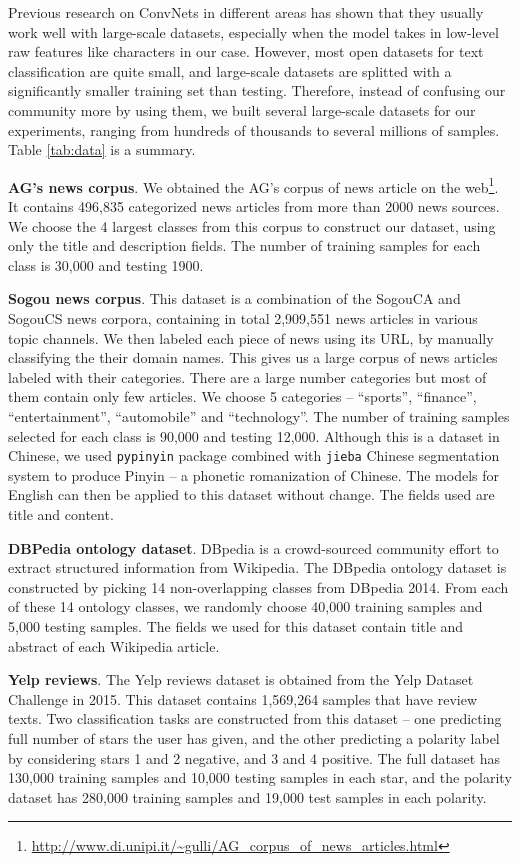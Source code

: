 Previous research on ConvNets in different areas has shown that they usually work well with large-scale datasets, especially when the model takes in low-level raw features like characters in our case. However, most open datasets for text classification are quite small, and large-scale datasets are splitted with a significantly smaller training set than testing\cite{LYRL04}. Therefore, instead of confusing our community more by using them, we built several large-scale datasets for our experiments, ranging from hundreds of thousands to several millions of samples. Table \ref{tab:data} is a summary.

\textbf{AG's news corpus}. We obtained the AG's corpus of news article on the web\footnote{\url{http://www.di.unipi.it/~gulli/AG_corpus_of_news_articles.html}}. It contains 496,835 categorized news articles from more than 2000 news sources. We choose the 4 largest classes from this corpus to construct our dataset, using only the title and description fields. The number of training samples for each class is 30,000 and testing 1900.

\textbf{Sogou news corpus}. This dataset is a combination of the SogouCA and SogouCS news corpora\cite{WZMR08}, containing in total 2,909,551 news articles in various topic channels. We then labeled each piece of news using its URL, by manually classifying the their domain names. This gives us a large corpus of news articles labeled with their categories. There are a large number categories but most of them contain only few articles. We choose 5 categories -- ``sports'', ``finance'', ``entertainment'', ``automobile'' and ``technology''. The number of training samples selected for each class is 90,000 and testing 12,000. Although this is a dataset in Chinese, we used \verb|pypinyin| package combined with \verb|jieba| Chinese segmentation system to produce Pinyin -- a phonetic romanization of Chinese. The models for English can then be applied to this dataset without change. The fields used are title and content.

\textbf{DBPedia ontology dataset}. DBpedia is a crowd-sourced community effort to extract structured information from Wikipedia\cite{LIJJKMHMKAB114}. The DBpedia ontology dataset is constructed by picking 14 non-overlapping classes from DBpedia 2014. From each of these 14 ontology classes, we randomly choose 40,000 training samples and 5,000 testing samples. The fields we used for this dataset contain title and abstract of each Wikipedia article.

\textbf{Yelp reviews}. The Yelp reviews dataset is obtained from the Yelp Dataset Challenge in 2015. This dataset contains 1,569,264 samples that have review texts. Two classification tasks are constructed from this dataset -- one predicting full number of stars the user has given, and the other predicting a polarity label by considering stars 1 and 2 negative, and 3 and 4 positive. The full dataset has 130,000 training samples and 10,000 testing samples in each star, and the polarity dataset has 280,000 training samples and 19,000 test samples in each polarity.


